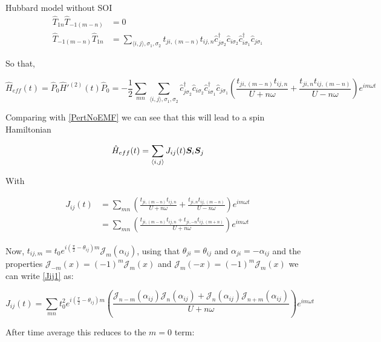\begin{section}{Hubbard model without SOI}
\begin{align*}
\hat{T}_{1n} \hat{T}_{-1(m-n)} &= 0 \\
\hat{T}_{-1(m-n)} \hat{T}_{1n} &= \sum_{\langle i,j \rangle, \sigma_1, \sigma_2} t_{ji,(m-n)} t_{ij,n} \hat{c}_{j \sigma_2}^\dagger \hat{c}_{i \sigma_2} \hat{c}_{i \sigma_1}^\dagger \hat{c}_{j \sigma_1}
\end{align*}

So that,

\begin{equation}
\hat{H}_{eff}(t) = \hat{P}_0\hat{H}'^{(2)}(t)\hat{P}_0 = - \frac{1}{2}\sum_{mn} \sum_{\langle i,j \rangle, \sigma_1, \sigma_2}\hat{c}_{j \sigma_2}^\dagger \hat{c}_{i \sigma_2} \hat{c}_{i \sigma_1}^\dagger \hat{c}_{j \sigma_1} \left( \frac{t_{ji,(m-n)} t_{ij,n}}{U+n\omega} + \frac{t_{ji,n} t_{ij,(m-n)}}{U-n\omega} \right) e^{im\omega t}
\end{equation}

Comparing with \ref{PertNoEMF} we can see that this will lead to a spin Hamiltonian 

\begin{equation}
\hat{H}_{eff}(t) = \sum_{\langle i,j \rangle} J_{ij}(t) \boldsymbol{S}_i \boldsymbol{S}_j
\end{equation}

With 

\begin{align}
J_{ij}(t) &= \sum_{mn} \left( \frac{t_{ji,(m-n)} t_{ij,n}}{U+n\omega} + \frac{t_{ji,n} t_{ij,(m-n)}}{U-n\omega} \right) e^{im\omega t} \nonumber \\
&= \sum_{mn} \left( \frac{t_{ji,(m-n)} t_{ij,n} + t_{ji,-n} t_{ij,(m+n)}}{U+n\omega} \right) e^{im\omega t} \label{Jij1}
\end{align}

Now, $t_{ij,m} = t_0 e^{i(\frac{\pi}{2}-\theta_{ij})m} \mathcal{J}_m(\alpha_{ij})$, using that $\theta_{ji} = \theta_{ij}$ and $\alpha_{ji} = -\alpha_{ij}$ and the properties $\mathcal{J}_{-m}(x) = (-1)^m\mathcal{J}_m(x)$ and $\mathcal{J}_m(-x) = (-1)^m\mathcal{J}_m(x)$ we can write \ref{Jij1} as:

\begin{equation}
J_{ij}(t) = \sum_{mn} t_0^2 e^{i(\frac{\pi}{2}-\theta_{ij})m}\left(\frac{\mathcal{J}_{n-m}(\alpha_{ij})\mathcal{J}_{n}(\alpha_{ij})+\mathcal{J}_{n}(\alpha_{ij})\mathcal{J}_{n+m}(\alpha_{ij})}{U+n\omega} \right) e^{im\omega t}
\end{equation}

After time average this reduces to the $m=0$ term:


\end{section}
